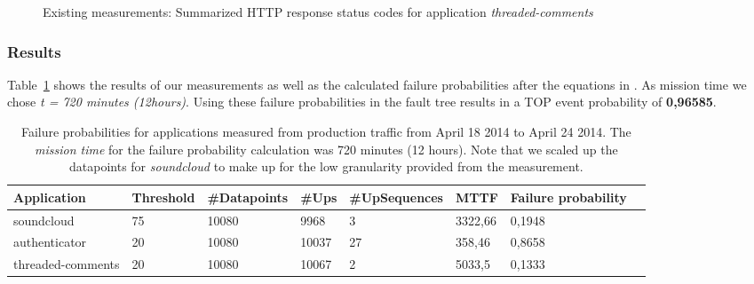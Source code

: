 \begin{figure}[ht]
  \caption{Existing measurements: Summarized HTTP response status codes for application \emph{threaded-comments}}
  \label{fig:measure_tr}
\end{figure}

\subsubsection{Results}

Table~\ref{tab:existing_measure_failure_probs} shows the results of our measurements as well as the calculated failure probabilities after the equations in . As mission time we chose \emph{t = 720 minutes (12hours)}. Using these failure probabilities in the fault tree results in a TOP event probability of \textbf{0,96585}.

\begin{table}
  \caption{Failure probabilities for applications measured from production traffic from April 18 2014 to April 24 2014. The \emph{mission time} for the failure probability calculation was 720 minutes (12 hours). Note that we scaled up the datapoints for \emph{soundcloud} to make up for the low granularity provided from the measurement.}
  \label{tab:existing_measure_failure_probs}
  \begin{adjustwidth}{-0.9in}{-.8in}
    \begin{tabular}{ |l|l|l|l|l|l|l|l| }
      \hline
      Application & Threshold & \#Datapoints & \#Ups & \#UpSequences & MTTF & Failure probability \\
      \hline
      soundcloud & 75 & 10080 & 9968 & 3 & 3322,66 & 0,1948 \\
      authenticator & 20 & 10080 & 10037 & 27 & 358,46 & 0,8658 \\
      threaded-comments & 20 & 10080 & 10067 & 2 & 5033,5 & 0,1333 \\
      \hline
    \end{tabular}
  \end{adjustwidth}
\end{table}

